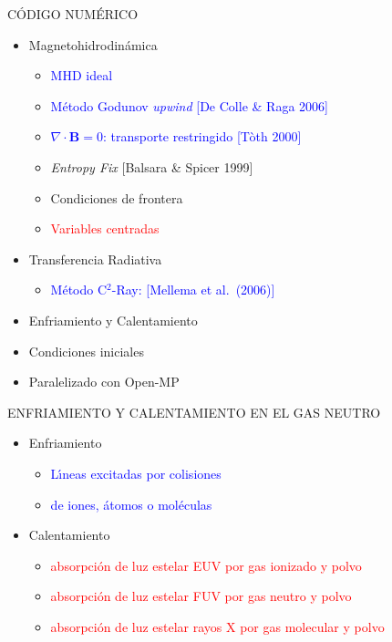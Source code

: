 \documentclass
[
]
{beamer}
\newcommand\red{\textcolor{red}}
\newcommand\darkgreen{\textcolor{green!85!black}}
\newcommand\blue{\textcolor{blue}}
\begin{document}
{
\begin{frame}[plain]
\centerline{\large C\'ODIGO NUM\'ERICO}
\vfill
\centering
\begin{itemize}
\item<1-> Magnetohidrodin\'amica
\begin{itemize}
\item<2->\blue{MHD ideal}
\item<2->\blue{M\'etodo Godunov \textit{upwind} [De Colle \& Raga 2006]}
\item<2->\blue{$\nabla \cdot \mathbf{B} = 0$: transporte restringido
  [T\`oth 2000]}
\item<4->\darkgreen{\textit{Entropy Fix} [Balsara \& Spicer 1999]}
\item<4->\darkgreen{Condiciones de frontera}
\item<5->\red{Variables centradas}
\end{itemize}
\vfill
\item<1-> Transferencia Radiativa
\begin{itemize}
\item<3->\blue{M\'etodo C$^2$-Ray: [Mellema et al.\ (2006)]}
\end{itemize}
\vfill
\item<1-> Enfriamiento y Calentamiento
\vfill
\item<1-> Condiciones iniciales
\vfill
\item<1-> Paralelizado con Open-MP
\vfill
\end{itemize}
\end{frame}
}
{
\begin{frame}[plain]
\centerline{\large ENFRIAMIENTO Y CALENTAMIENTO EN EL GAS NEUTRO}
\vfill
\centering
\begin{itemize}
\item<1->Enfriamiento
 \begin{itemize}
\item<2->\blue{L\'{\i}neas excitadas por colisiones}
\item<2->\blue{de iones, \'atomos o mol\'eculas }
  \end{itemize}
\vfill
\item<1->Calentamiento
\begin{itemize}
     \item<3->\red{ absorpci\'on de luz estelar EUV por gas ionizado y polvo}
     \item<3->\red{ absorpci\'on de luz estelar FUV por gas neutro y polvo}
     \item<3->\red{ absorpci\'on de luz estelar rayos X por gas molecular y polvo }
  \end{itemize}
\end{itemize}
\vfill
\end{frame}
}
\end{document}

